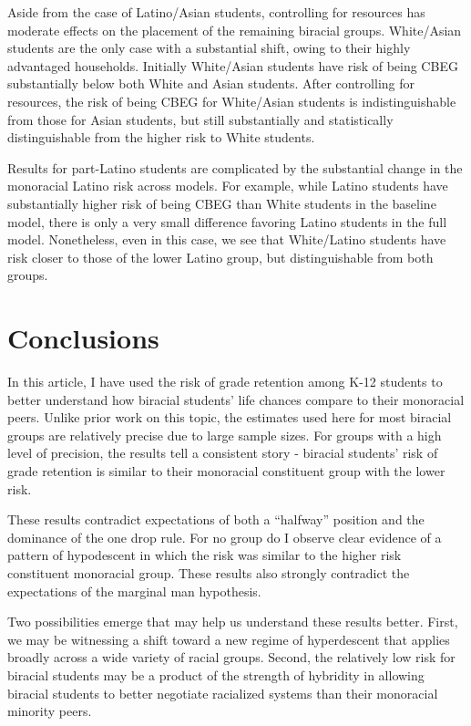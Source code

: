 \documentclass[
  letterpaper,
  DIV=11,
  numbers=noendperiod]{scrartcl}
\begin{document}
Aside from the case of Latino/Asian students, controlling for resources
has moderate effects on the placement of the remaining biracial groups.
White/Asian students are the only case with a substantial shift, owing
to their highly advantaged households. Initially White/Asian students
have risk of being CBEG substantially below both White and Asian
students. After controlling for resources, the risk of being CBEG for
White/Asian students is indistinguishable from those for Asian students,
but still substantially and statistically distinguishable from the
higher risk to White students.

Results for part-Latino students are complicated by the substantial
change in the monoracial Latino risk across models. For example, while
Latino students have substantially higher risk of being CBEG than White
students in the baseline model, there is only a very small difference
favoring Latino students in the full model. Nonetheless, even in this
case, we see that White/Latino students have risk closer to those of the
lower Latino group, but distinguishable from both groups.

\hypertarget{conclusions}{%
\section{Conclusions}\label{conclusions}}

In this article, I have used the risk of grade retention among K-12
students to better understand how biracial students' life chances
compare to their monoracial peers. Unlike prior work on this topic, the
estimates used here for most biracial groups are relatively precise due
to large sample sizes. For groups with a high level of precision, the
results tell a consistent story - biracial students' risk of grade
retention is similar to their monoracial constituent group with the
lower risk.

These results contradict expectations of both a ``halfway'' position and
the dominance of the one drop rule. For no group do I observe clear
evidence of a pattern of hypodescent in which the risk was similar to
the higher risk constituent monoracial group. These results also
strongly contradict the expectations of the marginal man hypothesis.

Two possibilities emerge that may help us understand these results
better. First, we may be witnessing a shift toward a new regime of
hyperdescent that applies broadly across a wide variety of racial
groups. Second, the relatively low risk for biracial students may be a
product of the strength of hybridity in allowing biracial students to
better negotiate racialized systems than their monoracial minority
peers.
\end{document}
